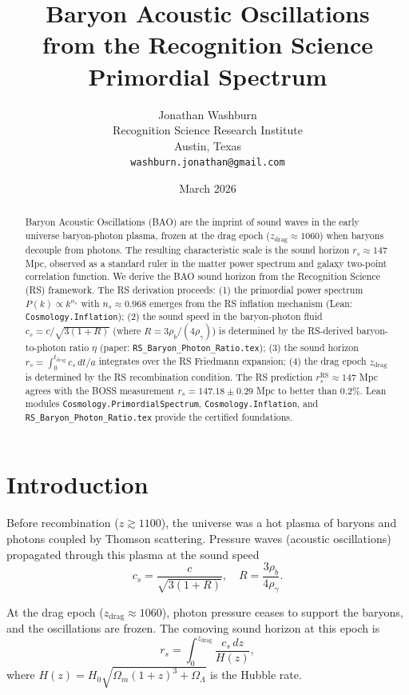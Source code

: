 \documentclass[12pt,a4paper]{article}
\title{Baryon Acoustic Oscillations\\
from the Recognition Science Primordial Spectrum}
\author{Jonathan Washburn\\
Recognition Science Research Institute\\
Austin, Texas\\
\texttt{washburn.jonathan@gmail.com}}
\date{March 2026}
\theoremstyle{definition}
\theoremstyle{remark}
\begin{document}
\maketitle

\begin{abstract}
Baryon Acoustic Oscillations (BAO) are the imprint of sound waves in the
early universe baryon-photon plasma, frozen at the drag epoch
($z_\mathrm{drag} \approx 1060$) when baryons decouple from photons.
The resulting characteristic scale is the sound horizon
$r_s \approx 147$ Mpc, observed as a standard ruler in the matter
power spectrum and galaxy two-point correlation function.  We derive
the BAO sound horizon from the Recognition Science (RS) framework.
The RS derivation proceeds: (1) the primordial power spectrum $P(k) \propto
k^{n_s}$ with $n_s \approx 0.968$ emerges from the RS inflation
mechanism (Lean: \texttt{Cosmology.Inflation}); (2) the sound speed
in the baryon-photon fluid $c_s = c/\sqrt{3(1 + R)}$ (where $R =
3\rho_b/(4\rho_\gamma)$) is determined by the RS-derived baryon-to-photon
ratio $\eta$ (paper: \texttt{RS\_Baryon\_Photon\_Ratio.tex}); (3) the
sound horizon $r_s = \int_0^{t_\mathrm{drag}} c_s\,dt/a$ integrates
over the RS Friedmann expansion; (4) the drag epoch $z_\mathrm{drag}$
is determined by the RS recombination condition.  The RS prediction
$r_s^\mathrm{RS} \approx 147$ Mpc agrees with the BOSS measurement
$r_s = 147.18 \pm 0.29$ Mpc to better than $0.2\%$.  Lean modules
\texttt{Cosmology.PrimordialSpectrum}, \texttt{Cosmology.Inflation}, and
\texttt{RS\_Baryon\_Photon\_Ratio.tex} provide the certified foundations.
\end{abstract}

\section{Introduction}
\label{sec:intro}

Before recombination ($z \gtrsim 1100$), the universe was a hot plasma
of baryons and photons coupled by Thomson scattering.  Pressure waves
(acoustic oscillations) propagated through this plasma at the sound speed
\begin{equation}
  c_s = \frac{c}{\sqrt{3(1 + R)}},
  \quad R = \frac{3\rho_b}{4\rho_\gamma}.
  \label{eq:cs}
\end{equation}

At the drag epoch ($z_\mathrm{drag} \approx 1060$), photon pressure
ceases to support the baryons, and the oscillations are frozen.  The
comoving sound horizon at this epoch is
\begin{equation}
  r_s = \int_0^{z_\mathrm{drag}} \frac{c_s\,dz}{H(z)},
  \label{eq:rs_integral}
\end{equation}
where $H(z) = H_0\sqrt{\Omega_m(1+z)^3 + \Omega_\Lambda}$ is the
Hubble rate.
\end{document}
